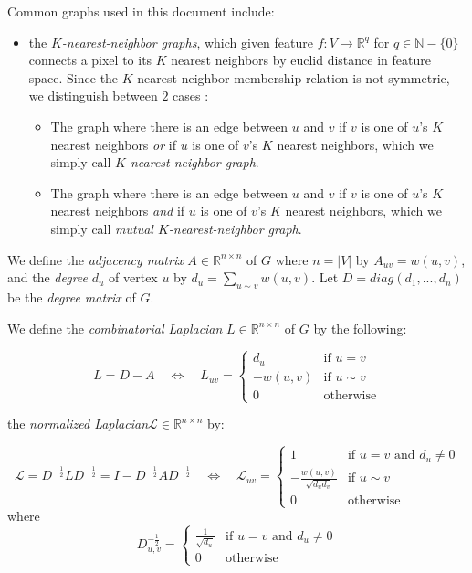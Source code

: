 Common graphs used in this document include:
\begin{itemize}
\item the \emph{$K$-nearest-neighbor graphs}, which given feature $f  : V \rightarrow \mathbb{R}^q$ for $q \in \mathbb{N} - \{0\}$ connects a pixel to its $K$ nearest neighbors by euclid distance in feature space. Since the $K$-nearest-neighbor membership relation is not symmetric, we distinguish between $2$ cases \cite{von2007tutorial}:
\begin{itemize}
\item The graph where there is an edge between $u$ and $v$ if $v$ is one of $u$'s $K$ nearest neighbors \emph{or} if $u$ is one of $v$'s $K$ nearest neighbors, which we simply call \emph{$K$-nearest-neighbor graph}.
\item The graph where there is an edge between $u$ and $v$ if $v$ is one of $u$'s $K$ nearest neighbors \emph{and} if $u$ is one of $v$'s $K$ nearest neighbors, which we simply call \emph{mutual $K$-nearest-neighbor graph}.
\end{itemize}
\end{itemize}

We define the \emph{adjacency matrix} $A \in \mathbb{R}^{n \times n}$ of $G$ where $n = |V|$ by $A_{uv} = w(u,v)$, and the \emph{degree} $d_u$ of vertex $u$ by $d_u = \sum_{u \sim v} w(u,v)$. Let $D = diag(d_1, ..., d_n)$ be the \emph{degree matrix} of $G$.

We define the \emph{combinatorial Laplacian} $L \in \mathbb{R}^{n \times n}$ of $G$ by the following:

\[
L = D - A \quad \Leftrightarrow \quad L_{uv} = \begin{cases}
d_u & \text{if }u = v \\
-w(u,v) & \text{if }u \sim v \\
0 & \text{otherwise}
\end{cases}
\]

the \emph{normalized Laplacian}\footnotemark[1] $\mathcal{L} \in \mathbb{R}^{n \times n}$ by:


\[
\mathcal{L} = D^{-\frac{1}{2}}LD^{-\frac{1}{2}} = I - D^{-\frac{1}{2}}AD^{-\frac{1}{2}} \quad \Leftrightarrow \quad \mathcal{L}_{uv} = \begin{cases}
1 & \text{if } u = v \text{ and } d_u \neq 0\\
-\frac{w(u,v)}{\sqrt{d_ud_v}} & \text{if } u \sim v\\
0 & \text{otherwise}
\end{cases}
\]
where
\[
D^{-\frac{1}{2}}_{u,v} = \begin{cases}
\frac{1}{\sqrt{d_u}} & \text{if }u = v\text{ and }d_u \neq 0\\
0 & \text{otherwise}
\end{cases}
\]

